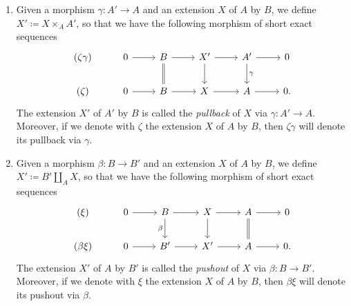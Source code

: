 \begin{defn}\leavevmode\vspace{-\baselineskip}
\begin{enumerate}
	\item Given a morphism $\gamma\colon A' \to A$ and an extension $X$
		of $A$ by $B$, we define $X' \coloneqq X \times_A A'$,
		so that we have the following morphism
		of short exact sequences
		\begin{equation*}
		\begin{tikzcd}
			(\zeta\gamma) &
			0 \arrow[r, "", rightarrow] &
			B \arrow[r, "", rightarrow] 
			\arrow[d, "", equals] &
			X' \arrow[r, "", rightarrow] 
			\arrow[d, "", rightarrow] &
			A' \arrow[r, "", rightarrow] 
			\arrow[d, "\gamma", rightarrow] &
			0\\
			(\zeta) &
			0 \arrow[r, "", rightarrow] &
			B \arrow[r, "", rightarrow] &
			X \arrow[r, "", rightarrow] &
			A \arrow[r, "", rightarrow] &
			0
		.\end{tikzcd}
		\end{equation*}
		The extension $X'$ of $A'$ by $B$
		is called the \emph{pullback} of $X$ via $\gamma\colon A' \to A$.
		Moreover, if we denote with $\zeta$ the extension
		$X$ of $A$ by $B$, then $\zeta\gamma$ will denote
		its pullback via $\gamma$.

	\item Given a morphism $\beta\colon B \to B'$ and an extension $X$
		of $A$ by $B$, we define $X' \coloneqq B' \amalg_A X$,
		so that we have the following morphism
		of short exact sequences
		\begin{equation*}
		\begin{tikzcd}
			(\xi) &
			0 \arrow[r, "", rightarrow] &
			B \arrow[r, "", rightarrow] 
			\arrow[d, "\beta"', rightarrow] &
			X \arrow[r, "", rightarrow] 
			\arrow[d, "", rightarrow] &
			A \arrow[r, "", rightarrow] 
			\arrow[d, "", equals] &
			0\\
			(\beta\xi) &
			0 \arrow[r, "", rightarrow] &
			B' \arrow[r, "", rightarrow] &
			X' \arrow[r, "", rightarrow] &
			A \arrow[r, "", rightarrow] &
			0
		.\end{tikzcd}
		\end{equation*}
		The extension $X'$ of $A$ by $B'$
		is called the \emph{pushout} of $X$ via $\beta\colon B \to B'$.
		Moreover, if we denote with $\xi$ the extension
		$X$ of $A$ by $B$, then $\beta\xi$ will denote
		its pushout via $\beta$.
\end{enumerate}
\end{defn}


